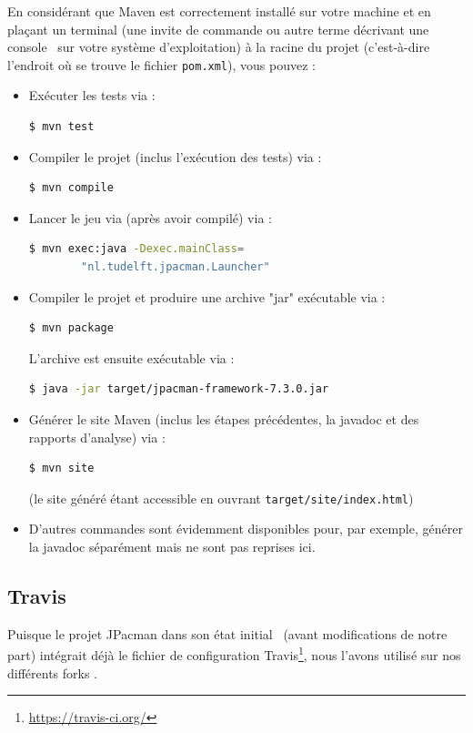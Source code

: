 \documentclass[12pt, openany]{report}
\begin{document}
En considérant que Maven est correctement installé sur votre machine et en plaçant un terminal (une invite de commande ou autre terme décrivant une \og console \fg \, sur votre système d'exploitation) à la racine du projet (c'est-à-dire l'endroit où se trouve le fichier \nolinkurl{pom.xml}), vous pouvez :
\begin{itemize}
	\item Exécuter les tests via :
	\begin{lstlisting}[language=bash]
	$ mvn test
	\end{lstlisting}
	\item Compiler le projet (inclus l'exécution des tests) via :
	\begin{lstlisting}[language=bash]
	$ mvn compile
	\end{lstlisting}
	\item Lancer le jeu via (après avoir compilé) via :
	\begin{lstlisting}[language=bash]
	$ mvn exec:java -Dexec.mainClass=
		"nl.tudelft.jpacman.Launcher"
	\end{lstlisting}
	\item Compiler le projet et produire une archive "jar" exécutable via :
	\begin{lstlisting}[language=bash]
	$ mvn package
	\end{lstlisting}
	L'archive est ensuite exécutable via :
	\begin{lstlisting}[language=bash]
	$ java -jar target/jpacman-framework-7.3.0.jar
	\end{lstlisting}
	\item Générer le site Maven (inclus les étapes précédentes, la javadoc et des rapports d'analyse) via :
	\begin{lstlisting}[language=bash]
	$ mvn site
	\end{lstlisting}
	(le site généré étant accessible en ouvrant \nolinkurl{target/site/index.html})
	\item D'autres commandes sont évidemment disponibles pour, par exemple, générer la javadoc séparément mais ne sont pas reprises ici.
\end{itemize}
                                                                                                                                                                              
\subsection{Travis}
Puisque le projet JPacman dans son état \og initial \fg \, (avant modifications de notre part) intégrait déjà le fichier de configuration Travis\footnote{\url{https://travis-ci.org/}}, nous l'avons utilisé sur nos différents \og forks \fg .
\end{document}
